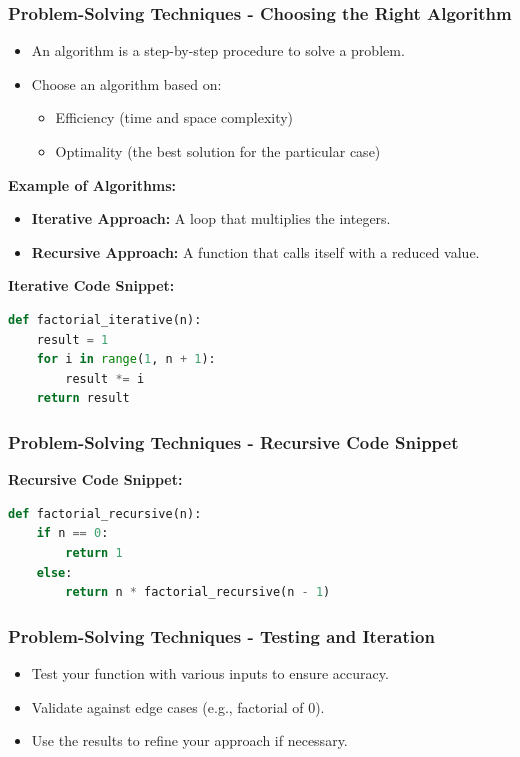 \documentclass{beamer}
\begin{document}
\begin{frame}[fragile]
    \frametitle{Problem-Solving Techniques - Choosing the Right Algorithm}
    \begin{itemize}
        \item An algorithm is a step-by-step procedure to solve a problem.
        \item Choose an algorithm based on:
        \begin{itemize}
            \item Efficiency (time and space complexity)
            \item Optimality (the best solution for the particular case)
        \end{itemize}
    \end{itemize}
    
    \textbf{Example of Algorithms:}
    \begin{itemize}
        \item \textbf{Iterative Approach:} A loop that multiplies the integers.
        \item \textbf{Recursive Approach:} A function that calls itself with a reduced value.
    \end{itemize}
    
    \textbf{Iterative Code Snippet:}
    \begin{lstlisting}[language=Python]
def factorial_iterative(n):
    result = 1
    for i in range(1, n + 1):
        result *= i
    return result
    \end{lstlisting}
\end{frame}

\begin{frame}[fragile]
    \frametitle{Problem-Solving Techniques - Recursive Code Snippet}
    \textbf{Recursive Code Snippet:}
    \begin{lstlisting}[language=Python]
def factorial_recursive(n):
    if n == 0:
        return 1
    else:
        return n * factorial_recursive(n - 1)
    \end{lstlisting}
\end{frame}

\begin{frame}
    \frametitle{Problem-Solving Techniques - Testing and Iteration}
    \begin{itemize}
        \item Test your function with various inputs to ensure accuracy.
        \item Validate against edge cases (e.g., factorial of 0).
        \item Use the results to refine your approach if necessary.
    \end{itemize}
\end{frame}
\end{document}
